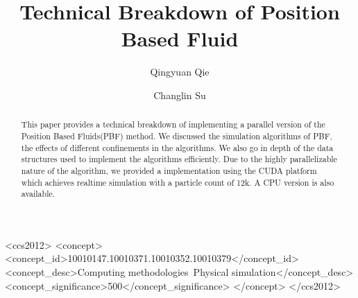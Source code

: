 \documentclass[sigconf]{acmart}
\begin{document}
\title{Technical Breakdown of Position Based Fluid}

\author{Qingyuan Qie}

\author{Changlin Su}

\renewcommand{\shortauthors}{Changlin and Qingyuan}

\begin{abstract}
  This paper provides a technical breakdown of implementing a parallel version of the Position Based Fluids(PBF) method. We discussed the simulation algorithms of PBF, the effects of different confinements in the algorithms. We also go in depth of the data structures used to implement the algorithms efficiently. Due to the highly parallelizable nature of the algorithm, we provided a implementation using the CUDA platform which achieves realtime simulation with a particle count of 12k. A CPU version is also available.
\end{abstract}

\begin{CCSXML}
  <ccs2012>
     <concept>
         <concept_id>10010147.10010371.10010352.10010379</concept_id>
         <concept_desc>Computing methodologies~Physical simulation</concept_desc>
         <concept_significance>500</concept_significance>
         </concept>
   </ccs2012>
\end{CCSXML}
  
\end{document}
